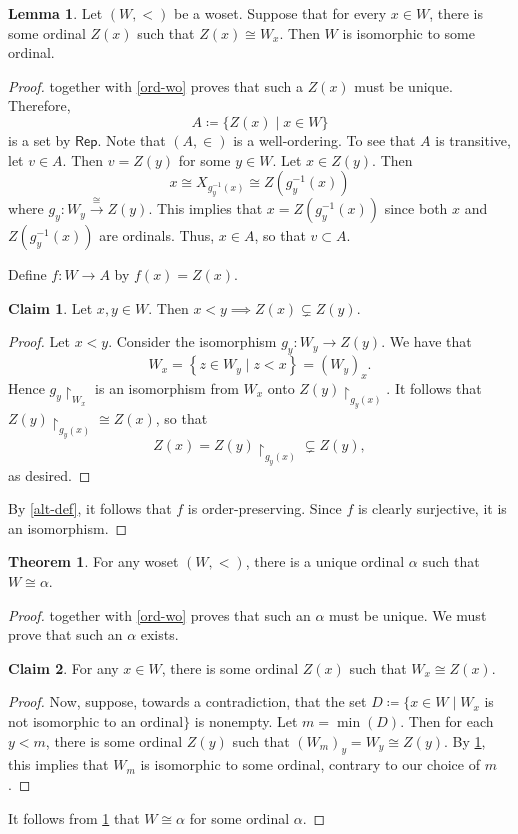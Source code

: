\documentclass[10pt,letterpaper,cm]{nupset}
\theoremstyle{definition}
\theoremstyle{theorem}
\newtheorem{theorem}[definition]{Theorem}
\newtheorem{lemma}[definition]{Lemma}
\newtheorem*{claim}{Claim}
\theoremstyle{remark}
\newcommand{\1}{\mathbf{1}}
\newcommand{\0}{\vec 0}
\begin{document}
\begin{lemma}\label{PL}
Let $\left(W, <\right)$ be a woset. Suppose that for every $x\in W$, there is some ordinal $Z(x)$ such that $Z(x) \cong W_x$. Then $W$ is isomorphic to some ordinal. 
\end{lemma}
\begin{proof}
 together with \cref{ord-wo} proves that such a $Z(x)$ must be unique. Therefore, $$A\coloneqq \{Z(x) \mid x \in W\}$$ is a set by $\mathsf{Rep}$. Note that $\left(A, \in\right)$ is a well-ordering. To see that $A$ is transitive, let $v\in A$. Then $v = Z(y)$ for some $y\in W$. Let $x\in Z(y)$. Then $$ x \cong X_{g_y^{-1}(x)} \cong Z(g^{-1}_y(x))    $$ where $g_y : W_y \overset{\cong}{\longrightarrow} Z(y)$.  This implies that $x = Z(g^{-1}_y(x))$ since both $x$ and $Z(g^{-1}_y(x))$ are ordinals. Thus, $x \in A$, so that $v\subset A$.

\smallskip

Define $f : W \to A$ by $f(x) = Z(x)$. 
\begin{claim} 
Let $x,y\in W$. Then $x <y \implies Z(x) \subsetneq Z(y)$. 
\end{claim}
\begin{proof}
Let $x<y$. Consider the isomorphism $g_y : W_y \to Z(y)$. We have that $$W_x = \left\{z\in W_y \mid  z < x\right\} = \left(W_y\right)_x.$$ Hence $g_y\restriction_{W_x}$ is an isomorphism from $W_x$ onto $Z(y)\restriction_{g_y(x)}$. It follows that $Z(y)\restriction_{g_y(x)} \cong Z(x)$, so that $$Z(x) = Z(y)\restriction_{g_y(x)} \subsetneq Z(y),$$ as desired. 
\end{proof}
By \cref{alt-def}, it follows that $f$ is order-preserving. Since $f$ is clearly surjective, it is an isomorphism.
\end{proof}

\begin{theorem} 
For any woset $\left(W, <\right)$, there is a unique ordinal $\alpha$ such that $W \cong \alpha$.
\end{theorem}
\begin{proof}
 together with \cref{ord-wo} proves that such an $\alpha$ must be unique. We must prove that such an $\alpha$ exists.
\begin{claim}
For any $x\in W$, there is some ordinal $Z(x)$ such that $W_x \cong Z(x)$.
\end{claim}
\begin{proof}
Now, suppose, towards a contradiction, that the set $D\coloneqq \{ x\in W \mid W_x$ is not isomorphic to an ordinal$\}$ is nonempty.   Let $m = \min(D)$. Then for each $y< m$, there is some ordinal $Z(y)$ such that $\left(W_m\right)_y = W_y \cong Z(y)$.  By \cref{PL}, this implies that $W_m$ is isomorphic to some ordinal, contrary to our choice of $m$.
\end{proof}It follows from \cref{PL} that $W \cong \alpha$ for some ordinal $\alpha$.
\end{proof}
\end{document}
